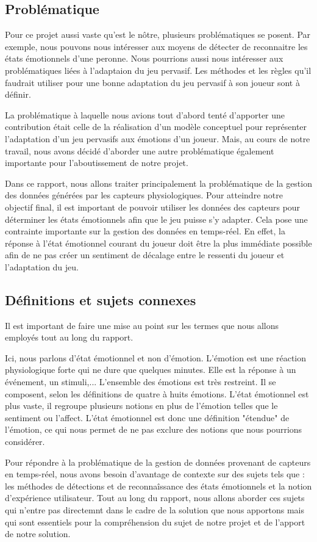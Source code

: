 \documentclass{article}
\begin{document}
	\subsection{Problématique}
		Pour ce projet aussi vaste qu'est le nôtre, plusieurs problématiques se posent.
		Par exemple, nous pouvons nous intéresser aux moyens de détecter de reconnaitre les états émotionnels d'une peronne.
		Nous pourrions aussi nous intéresser aux problématiques liées à l'adaptaion du jeu pervasif.
		Les méthodes et les règles qu'il faudrait utiliser pour une bonne adaptation du jeu pervasif à son joueur sont à définir.\par
		La problématique à laquelle nous avions tout d'abord tenté d'apporter une contribution était celle de la réalisation d'un modèle conceptuel pour représenter l'adaptation d'un jeu pervasifs aux émotions d'un joueur.
		Mais, au cours de notre travail, nous avons décidé d'aborder une autre problématique également importante pour l'aboutissement de notre projet.\par
		Dans ce rapport, nous allons traiter principalement la problématique de la gestion des données générées par les capteurs physiologiques.
		Pour atteindre notre objectif final, il est important de pouvoir utiliser les données des capteurs pour déterminer les états émotionnels afin que le jeu puisse s'y adapter. 
		Cela pose une contrainte importante sur la gestion des données en temps-réel.
		En effet, la réponse à l'état émotionnel courant du joueur doit être la plus immédiate possible afin de ne pas créer un sentiment de décalage entre le ressenti du joueur et l'adaptation du jeu.
	\subsection{Définitions et sujets connexes}
		Il est important de faire une mise au point sur les termes que nous allons employés tout au long du rapport.\par
		Ici, nous parlons d'état émotionnel et non d'émotion.
		L'émotion est une réaction physiologique forte qui ne dure que quelques minutes.
		Elle est la réponse à un événement, un stimuli,...
		L'ensemble des émotions est très restreint.
		Il se composent, selon les définitions de quatre à huits émotions.
		L'état émotionnel est plus vaste, il regroupe plusieurs notions en plus de l'émotion telles que le sentiment ou l'affect.
		L'état émotionnel est donc une définition "étendue" de l'émotion, ce qui nous permet de ne pas exclure des notions que nous pourrions considérer.\par
		Pour répondre à la problématique de la gestion de données provenant de capteurs en temps-réel, nous avons besoin d'avantage de contexte sur des sujets tels que : les méthodes de détections et de reconnaîssance des états émotionnels et la notion d'expérience utilisateur.
		Tout au long du rapport, nous allons aborder ces sujets qui n'entre pas directemnt dans le cadre de la solution que nous apportons mais qui sont essentiels pour la compréhension du sujet de notre projet et de l'apport de notre solution.
\end{document}
